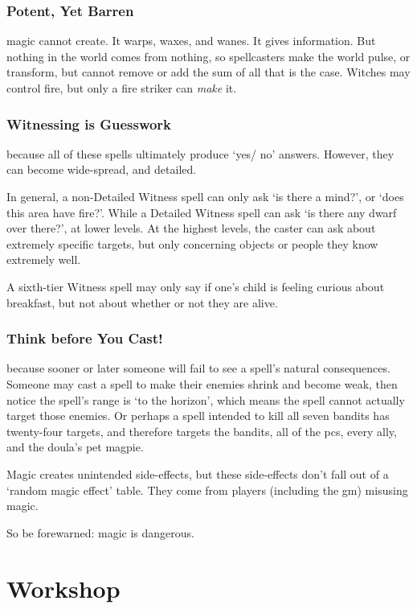 \begin{multicols}{2}
\subsubsection{Potent, Yet Barren}
magic cannot create.
It warps, waxes, and wanes.
It gives information.
But nothing in the world comes from nothing, so spellcasters make the world pulse, or transform, but cannot remove or add the sum of all that is the case.
Witches may control fire, but only a fire striker can \textit{make} it.

\subsubsection{Witnessing is Guesswork}
because all of these spells ultimately produce `yes/ no' answers.
However, they can become wide-spread, and detailed.

In general, a non-Detailed Witness spell can only ask `is there a mind?', or `does this \gls{area} have fire?'.
While a Detailed Witness spell can ask `is there any dwarf over there?', at lower levels.
At the highest levels, the caster can ask about extremely specific targets, but only concerning objects or people they know extremely well.

A sixth-tier Witness spell may only say if one's child is feeling curious about breakfast, but not about whether or not they are alive.

\subsubsection{Think before You Cast!}
because sooner or later someone will fail to see a spell's natural consequences.
Someone may cast a spell to make their enemies shrink and become weak, then notice the spell's range is `to the horizon', which means the spell cannot actually target those enemies.
Or perhaps a spell intended to kill all seven bandits has twenty-four targets, and therefore targets the bandits, all of the \glspl{pc}, every ally, and the \gls{doula}'s pet magpie.

Magic creates unintended side-effects, but these side-effects don't fall out of a `random magic effect' table.
They come from players (including the \gls{gm}) misusing magic.

So be forewarned: magic is dangerous.

\end{multicols}

\section{ Workshop}

